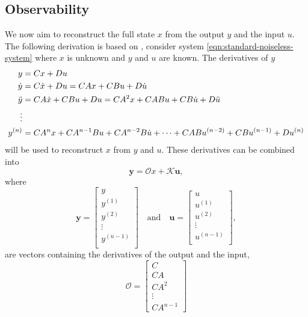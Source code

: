 \subsection{Observability}
We now aim to reconstruct the full state $x$ from the output $y$ and the input $u$. The following derivation is based on \cite{StephenBoyd2009ObservabilitySlides}, consider system \eqref{eqn:standard-noiseless-system} where $x$ is unknown and $y$ and $u$ are known. The derivatives of $y$ 
\[
\begin{split}
y &= Cx + Du \\
\dot{y} &= C\dot{x} + Du =  CAx + CBu + D\dot{u} \\
\Ddot{y} &= CA\dot{x} + CBu + Du = CA^{2}x + CABu + CB\dot{u} + D\Ddot{u} \\
\vdots \\
y^{(n)} &= CA^{n}x + CA^{n-1}Bu + CA^{n-2}B\dot{u} + \dots + CABu^{(n-2)} + CBu^{(n-1)} + Du^{(n)}
\end{split}
\]
will be used to reconstruct $x$ from $y$ and $u$. These derivatives can be combined into
\[ \mathbf{y} =  \mathcal{O}x + \mathcal{K}\mathbf{u}
,\]
where
\[\mathbf{y}=
\begin{bmatrix}
    y \\
    y^{(1)} \\
    y^{(2)} \\
    \vdots \\
    y^{(n-1)} \\
\end{bmatrix} \quad \text{and} \quad
\mathbf{u} = 
\begin{bmatrix}
    u \\
    u^{(1)} \\
    u^{(2)} \\
    \vdots \\
    u^{(n-1)} \\
\end{bmatrix},
\]
are vectors containing the derivatives of the output and the input,
\begin{equation}\label{eqn:observability-matrix}
    \mathcal{O}=
    \begin{bmatrix}
        C \\
        CA \\
        CA^2 \\
        \vdots \\
        CA^{n-1}
    \end{bmatrix}    
\end{equation}

